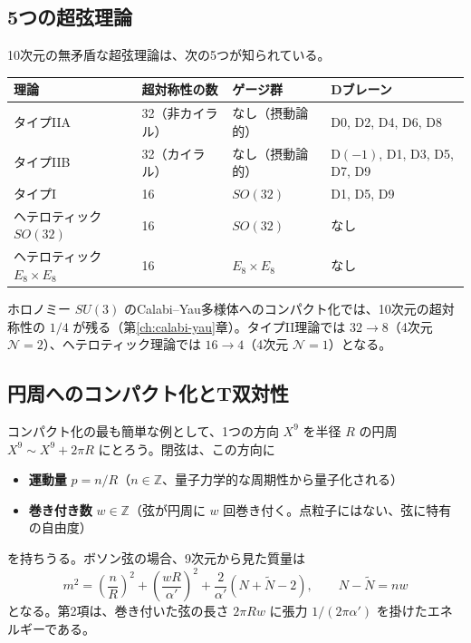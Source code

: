 \documentclass[uplatex, dvipdfmx, book]{jsbook}
\let\origsubsection\subsection
\let\origsubsubsection\subsubsection
\renewcommand{\section}{\origsubsection}
\renewcommand{\subsection}{\origsubsubsection}
\renewcommand{\subsubsection}{\paragraph}
\begin{document}
\section{5つの超弦理論}

10次元の無矛盾な超弦理論は、次の5つが知られている。

\begin{center}\small\setlength{\tabcolsep}{4pt}
\begin{tabular}{llll}
    \hline
    理論 & 超対称性の数 & ゲージ群 & Dブレーン \\
    \hline
    タイプIIA & 32（非カイラル） & なし（摂動論的） & D0, D2, D4, D6, D8 \\
    タイプIIB & 32（カイラル） & なし（摂動論的） & D$(-1)$, D1, D3, D5, D7, D9 \\
    タイプI & 16 & $SO(32)$ & D1, D5, D9 \\
    ヘテロティック $SO(32)$ & 16 & $SO(32)$ & なし \\
    ヘテロティック $E_8 \times E_8$ & 16 & $E_8 \times E_8$ & なし \\
    \hline
\end{tabular}
\end{center}

ホロノミー $SU(3)$ のCalabi--Yau多様体へのコンパクト化では、10次元の超対称性の $1/4$ が残る（第\ref{ch:calabi-yau}章）。タイプII理論では $32 \to 8$（4次元 $\mathcal{N} = 2$）、ヘテロティック理論では $16 \to 4$（4次元 $\mathcal{N} = 1$）となる。

\section{円周へのコンパクト化とT双対性}

コンパクト化の最も簡単な例として、1つの方向 $X^{9}$ を半径 $R$ の円周 $X^9 \sim X^9 + 2\pi R$ にとろう。閉弦は、この方向に
\begin{itemize}
    \item \textbf{運動量} $p = n/R$（$n \in \mathbb{Z}$、量子力学的な周期性から量子化される）
    \item \textbf{巻き付き数} $w \in \mathbb{Z}$（弦が円周に $w$ 回巻き付く。点粒子にはない、弦に特有の自由度）
\end{itemize}
を持ちうる。ボソン弦の場合、9次元から見た質量は
\begin{equation}
    m^2 = \left( \frac{n}{R} \right)^2 + \left( \frac{wR}{\alpha'} \right)^2 + \frac{2}{\alpha'}\left( N + \tilde{N} - 2 \right), \qquad N - \tilde{N} = nw
\end{equation}
となる。第2項は、巻き付いた弦の長さ $2\pi R w$ に張力 $1/(2\pi\alpha')$ を掛けたエネルギーである。
\end{document}
